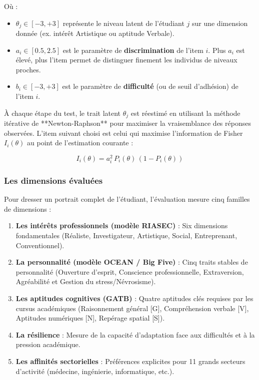 Où :
\begin{itemize}
    \item $\theta_j \in [-3, +3]$ représente le niveau latent de l'étudiant $j$ sur une dimension donnée (ex. intérêt Artistique ou aptitude Verbale).
    \item $a_i \in [0.5, 2.5]$ est le paramètre de \textbf{discrimination} de l'item $i$. Plus $a_i$ est élevé, plus l'item permet de distinguer finement les individus de niveaux proches.
    \item $b_i \in [-3, +3]$ est le paramètre de \textbf{difficulté} (ou de seuil d'adhésion) de l'item $i$.
\end{itemize}

À chaque étape du test, le trait latent $\theta_j$ est réestimé en utilisant la méthode itérative de **Newton-Raphson** pour maximiser la vraisemblance des réponses observées. L'item suivant choisi est celui qui maximise l'information de Fisher $I_i(\theta)$ au point de l'estimation courante :

\begin{equation}
I_i(\theta) = a_i^2 \, P_i(\theta) \, (1 - P_i(\theta))
\label{eq:fisher_info}
\end{equation}

\subsubsection{Les dimensions évaluées}

Pour dresser un portrait complet de l'étudiant, l'évaluation mesure cinq familles de dimensions :
\begin{enumerate}
    \item \textbf{Les intérêts professionnels (modèle RIASEC)} : Six dimensions fondamentales (Réaliste, Investigateur, Artistique, Social, Entreprenant, Conventionnel).
    \item \textbf{La personnalité (modèle OCEAN / Big Five)} : Cinq traits stables de personnalité (Ouverture d'esprit, Conscience professionnelle, Extraversion, Agréabilité et Gestion du stress/Névrosisme).
    \item \textbf{Les aptitudes cognitives (GATB)} : Quatre aptitudes clés requises par les cursus académiques (Raisonnement général [G], Compréhension verbale [V], Aptitudes numériques [N], Repérage spatial [S]).
    \item \textbf{La résilience} : Mesure de la capacité d'adaptation face aux difficultés et à la pression académique.
    \item \textbf{Les affinités sectorielles} : Préférences explicites pour 11 grands secteurs d'activité (médecine, ingénierie, informatique, etc.).
\end{enumerate}

